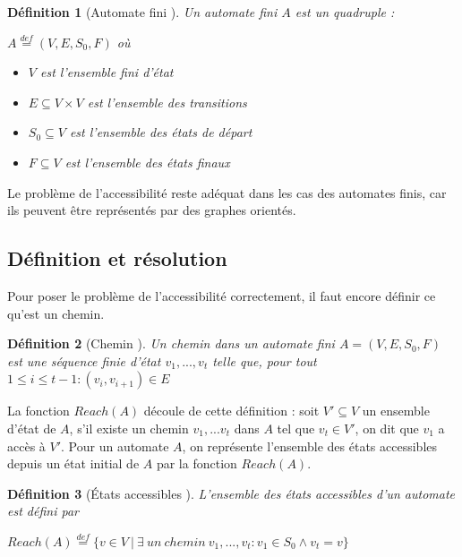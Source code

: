 \documentclass[12pt,a4paper,oneside]{book}
\theoremstyle{break}
\newtheorem{defin}{Définition}[chapter]
\theoremstyle{breakplain}
\begin{document}
\begin{defin}[Automate fini \cite{geeraerts2013multiprocessor}]
Un automate fini $A$ est un quadruple :

\begin{center}
$A\overset{def}{=}(V,E,S_0,F)$ où
\end{center}

\begin{itemize}
\item $V$ est l'ensemble fini d'état
\item $E \subseteq V \times V$ est l'ensemble des transitions
\item $S_0 \subseteq V$ est l'ensemble des états de départ
\item $F \subseteq V$ est l'ensemble des états finaux
\end{itemize}

\end{defin}

Le problème de l'accessibilité reste adéquat dans les cas des automates finis, car ils peuvent être représentés par des graphes orientés.\\


\subsection{Définition et résolution}
Pour poser le problème de l'accessibilité correctement, il faut encore définir ce qu'est un chemin.\\

\begin{defin}[Chemin \cite{geeraerts2013multiprocessor}]
Un chemin dans un automate fini $A = (V, E, S_0, F)$ est une séquence finie d'état $v_1, ..., v_t$ telle que, pour tout $1 \leq i \leq t-1 : (v_i, v_{i+1}) \in E$ 
\end{defin}

La fonction $Reach(A)$ découle de cette définition : soit $V' \subseteq V$ un ensemble d'état de $A$, s'il existe un chemin $v_1,...v_t$ dans $A$ tel que $v_t \in V'$, on dit que $v_1$ a accès à $V'$. Pour un automate $A$, on représente l'ensemble des états accessibles depuis un état initial de $A$ par la fonction $Reach(A)$.\\

\begin{defin}[États accessibles \cite{geeraerts2013multiprocessor}]
L'ensemble des états accessibles d'un automate est défini par 
\begin{center}
$Reach(A) \overset{def}{=} \{v \in V\ |\ \exists\ un\ chemin\ v_1,...,v_t : v_1 \in S_0 \wedge v_t = v\}$
\end{center}
\end{defin}
\end{document}
